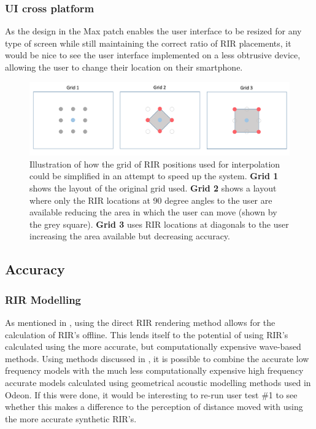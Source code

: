 \documentclass[../../main.tex]{subfiles}
\begin{document}
		\subsubsection{UI cross platform}
			As the design in the Max patch enables the user interface to be resized for any type of screen while still maintaining the correct ratio of \ac{RIR} placements, it would be nice to see the user interface implemented on a less obtrusive device, allowing the user to change their location on their smartphone.

			\begin{figure}[H]
				\centerline{\includegraphics[scale = 0.45]{Sections/FurtherWork/images/grids2.png}}
				\caption{Illustration of how the grid of \ac{RIR} positions used for interpolation could be simplified in an attempt to speed up the system. \textbf{Grid 1} shows the layout of the original grid used. \textbf{Grid 2} shows a layout where only the \ac{RIR} locations at 90 degree angles to the user are available reducing the area in which the user can move (shown by the grey square). \textbf{Grid 3} uses \ac{RIR} locations at diagonals to the user increasing the area available but decreasing accuracy.}
				\label{grids}
			\end{figure}

	\subsection{Accuracy}
		\subsubsection{RIR Modelling}
			As mentioned in , using the direct \ac{RIR} rendering method allows for the calculation of \ac{RIR}'s offline. This lends itself to the potential of using \ac{RIR}'s calculated using the more accurate, but computationally expensive wave-based methods. Using methods discussed in \cite{Southern}, it is possible to combine the accurate low frequency models with the much less computationally expensive high frequency accurate models calculated using geometrical acoustic modelling methods used in Odeon. If this were done, it would be interesting to re-run user test \#1 to see whether this makes a difference to the perception of distance moved with using the more accurate synthetic \ac{RIR}'s.
\end{document}
